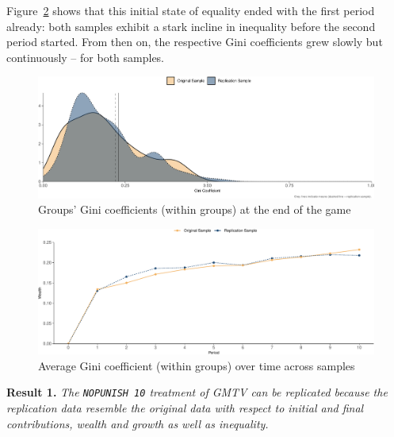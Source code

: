 \documentclass[
  authoryear,
  preprint,
  3p]{elsarticle}
\begin{document}
Figure~\ref{fig-ginit-time-series} shows that this initial state of
equality ended with the first period already: both samples exhibit a
stark incline in inequality before the second period started. From then
on, the respective Gini coefficients grew slowly but continuously -- for
both samples.

\begin{figure}

{\centering \includegraphics{paper_files/figure-pdf/fig-gini-distribution-1.pdf}

}

\caption{\label{fig-gini-distribution}Groups' Gini coefficients (within
groups) at the end of the game}

\end{figure}

\begin{figure}

{\centering \includegraphics{paper_files/figure-pdf/fig-ginit-time-series-1.pdf}

}

\caption{\label{fig-ginit-time-series}Average Gini coefficient (within
groups) over time across samples}

\end{figure}

\textbf{Result 1.} \emph{The \texttt{NOPUNISH\ 10} treatment of GMTV can
be replicated because the replication data resemble the original data
with respect to initial and final contributions, wealth and growth as
well as inequality.}
\end{document}
